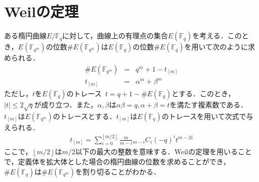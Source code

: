 \section{Weilの定理}
\par
ある楕円曲線$E/\mathbb {F}_q$に対して，曲線上の有理点の集合$E(\mathbb {F}_q)$を考える．このとき，$E(\mathbb {F}_{q^m})$の位数$\# E(\mathbb {F}_{q^m})$は$E(\mathbb {F}_q)$の位数$\# E(\mathbb {F}_q)$を用いて次のように求められる．
\begin{eqnarray*}
\# E(\mathbb {F}_{q^m})&=&q^m+1-t_{[m]}\\
t_{[m]}&=&\alpha ^m+\beta ^m
\end{eqnarray*}
ただし，$t$を$E(\mathbb {F}_q)$のトレース\ $t=q+1-\# E(\mathbb {F}_q)$とする．このとき，$|t|\le 2 \sqrt{q}$が成り立つ．また，$\alpha ,\beta $は$\alpha \beta =q,\alpha +\beta =t$を満たす複素数である．$t_{[m]}$は$E(\mathbb {F}_{q^m})$のトレースとする．$t_{[m]}$は$E(\mathbb {F}_q)$のトレースを用いて次式で与えられる．
\begin{eqnarray*}
t_{[m]}=\sum\limits _{i=0}^{\left\lfloor m/2\right\rfloor}\frac{m}{m-i} {}_{m-i}C_i(-q)^it^{m-2i}
\end{eqnarray*}ここで，$\left\lfloor m/2\right\rfloor$は$m/2$以下の最大の整数を意味する．Weilの定理を用いることで，定義体を拡大体とした場合の楕円曲線の位数を求めることができ，$\# E(\mathbb {F}_q)$は$\# E(\mathbb {F}_{q^m})$を割り切ることがわかる．\\
\par
